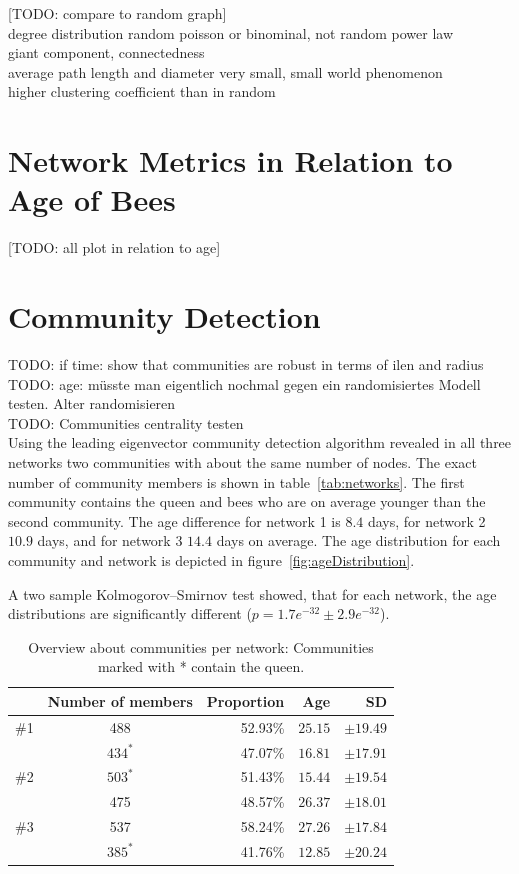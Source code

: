 [TODO: compare to random graph]\\
degree distribution random poisson or binominal, not random power law\\
giant component, connectedness\\
average path length and diameter very small, small world phenomenon\\
higher clustering coefficient than in random\\

\section{Network Metrics in Relation to Age of Bees}

[TODO: all plot in relation to age]

\section{Community Detection}

TODO: if time: show that communities are robust in terms of ilen and radius\\
TODO: age: müsste man eigentlich nochmal gegen ein randomisiertes Modell testen. Alter randomisieren\\
TODO: Communities centrality testen\\

Using the leading eigenvector community detection algorithm revealed in all three networks two communities with about the same number of nodes. The exact number of community members is shown in table~\ref{tab:networks}. The first community contains the queen and bees who are on average younger than the second community. The age difference for network 1 is $8.4$ days, for network 2 $10.9$ days, and for network 3 $14.4$ days on average. The age distribution for each community and network is depicted in figure~\ref{fig:ageDistribution}.

A two sample Kolmogorov–Smirnov test showed, that for each network, the age distributions are significantly different ($p=1.7e^{-32} \pm2.9e^{-32}$).

\begin{table}
\centering
\begin{tabular}{ccrrr}
	\toprule
	{}  & Number of members & Proportion & Age & SD\\
	\midrule 
	\#1  & 488     & 52.93\% & $25.15$ & $\pm19.49$ \\
	             & $434^*$ & 47.07\% & $16.81$ & $\pm17.91$ \\
	\midrule   							
	\#2  & $503^*$ & 51.43\% & $15.44$ & $\pm19.54$ \\
	             & 475     & 48.57\% & $26.37$ & $\pm18.01$ \\
	\midrule  
	\#3  & 537     & 58.24\% & $27.26$ & $\pm17.84$ \\
	             & $385^*$ & 41.76\% & $12.85$ & $\pm20.24$ \\
	\bottomrule
\end{tabular}
\caption[Overview about communities]{Overview about communities per network: Communities marked with * contain the queen.}
\label{tab:communities}
\end{table}

